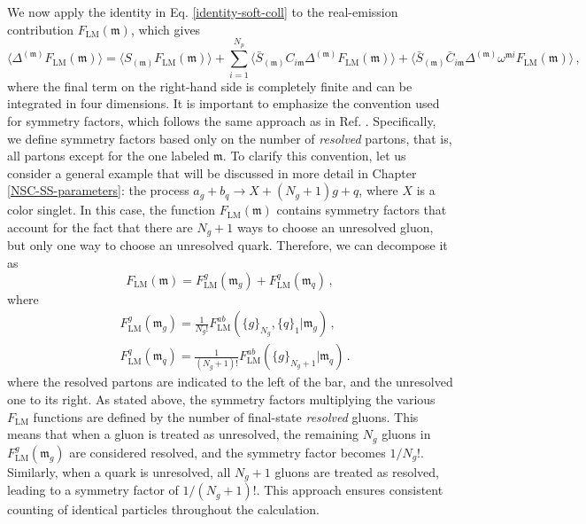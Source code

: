 \documentclass[a4paper, 12pt]{book}
\newcommand{\um}{\mathfrak{m}}
\begin{document}
We now apply the identity in Eq. \ref{identity-soft-coll} to the real-emission contribution $F_{\mathrm{LM}}(\um)$, which gives
\begin{equation}
  \langle \Delta^{(\um)}F_{\mathrm{LM}}(\um) \rangle = \langle S_{(\um)}F_{\mathrm{LM}}(\um) \rangle + \sum_{i=1}^{N_p} \langle \bar{S}_{(\um)}C_{i\um} \Delta^{(\um)} F_{\mathrm{LM}}(\um) \rangle + \langle \bar{S}_{(\um)} \bar{C}_{i\um} \Delta^{(\um)} \omega^{\um i} F_{\mathrm{LM}}(\um) \rangle \, ,
  \label{identity-flm}
\end{equation}
where the final term on the right-hand side is completely finite and can be integrated in four dimensions. It is important to emphasize the convention used for symmetry factors, which follows the same approach as in Ref. \cite{Devoto:2025kin}. Specifically, we define symmetry factors based only on the number  of \emph{resolved} partons, that is, all partons except for the one labeled $\um$.  To clarify this convention, let us consider a general example that will be discussed in more detail in Chapter \ref{NSC-SS-parameters}: the process $a_g + b_q \to X + (N_g+1)g + q$, where $X$ is a color singlet. In this case, the function $F_{\mathrm{LM}}(\um)$ contains symmetry  factors that account for the fact that there are $N_g+1$ ways to choose an unresolved gluon, but 
only one way to choose an unresolved quark. Therefore, we can decompose it as
\begin{equation}
  F_{\mathrm{LM}}(\um) = F_{\mathrm{LM}}^g(\um_g) +F_{\mathrm{LM}}^q(\um_q) \, ,
\end{equation}
where
\begin{equation}
  \begin{aligned}
    & F_{\mathrm{LM}}^g(\um_g) = \frac{1}{N_g!}  F_{\mathrm{LM}}^{ab} \left(\{g\}_{N_g}, \{q\}_1 | \um_g \right) \, , \\
    & F_{\mathrm{LM}}^q(\um_q) = \frac{1}{(N_g+1)!}  F_{\mathrm{LM}}^{ab} \left(\{g\}_{N_g+1}| \um_q \right) \, .
  \end{aligned}
\end{equation}
where the resolved partons are indicated to the left of the bar, and the unresolved one to its right. As stated above, the symmetry factors multiplying the various $F_{\mathrm{LM}}$ functions are defined by the number of final-state \emph{resolved} gluons. This means that when a gluon is treated as unresolved, the remaining $N_g$ gluons in $F_{\mathrm{LM}}^g(\um_g)$ are considered resolved, and the symmetry factor becomes $1/N_g!$. Similarly, when a quark is unresolved, all $N_g+1$ 
gluons are treated as resolved, leading to a symmetry factor of $1/(N_g+1)!$. This approach ensures consistent counting of identical particles throughout the calculation.
\end{document}
